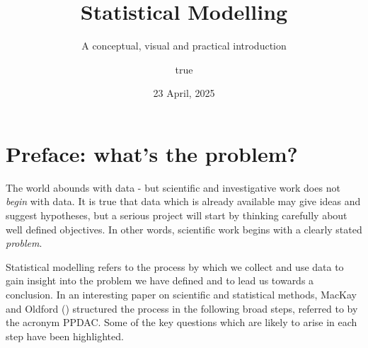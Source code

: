 \documentclass[
]{book}
\title{Statistical Modelling}
\subtitle{A conceptual, visual and practical introduction}
\author{true}
\date{23 April, 2025}
\begin{document}
\maketitle

{
\hypersetup{linkcolor=}
\setcounter{tocdepth}{1}
\tableofcontents
}
\chapter*{Preface: what's the problem?}\label{preface-whats-the-problem}

The world abounds with data - but scientific and investigative work does not \emph{begin} with data. It is true that data which is already available may give ideas and suggest hypotheses, but a serious project will start by thinking carefully about well defined objectives. In other words, scientific work begins with a clearly stated \emph{problem}.

Statistical modelling refers to the process by which we collect and use data to gain insight into the problem we have defined and to lead us towards a conclusion. In an interesting paper on scientific and statistical methods, MacKay and Oldford () structured the process in the following broad steps, referred to by the acronym PPDAC. Some of the key questions which are likely to arise in each step have been highlighted.
\end{document}
